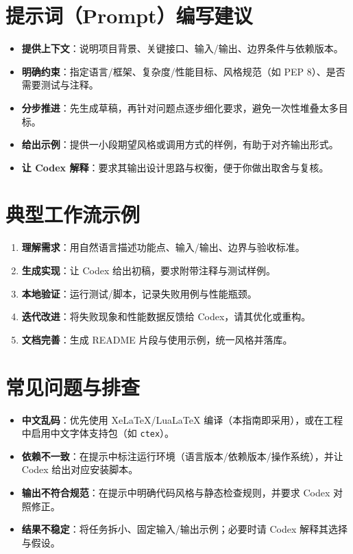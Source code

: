 \documentclass[UTF8,zihao=-4]{ctexart}
\begin{document}
\section{提示词（Prompt）编写建议}
\begin{itemize}
  \item \textbf{提供上下文}：说明项目背景、关键接口、输入/输出、边界条件与依赖版本。
  \item \textbf{明确约束}：指定语言/框架、复杂度/性能目标、风格规范（如 PEP 8）、是否需要测试与注释。
  \item \textbf{分步推进}：先生成草稿，再针对问题点逐步细化要求，避免一次性堆叠太多目标。
  \item \textbf{给出示例}：提供一小段期望风格或调用方式的样例，有助于对齐输出形式。
  \item \textbf{让 Codex 解释}：要求其输出设计思路与权衡，便于你做出取舍与复核。
\end{itemize}

\section{典型工作流示例}
\begin{enumerate}
  \item \textbf{理解需求}：用自然语言描述功能点、输入/输出、边界与验收标准。
  \item \textbf{生成实现}：让 Codex 给出初稿，要求附带注释与测试样例。
  \item \textbf{本地验证}：运行测试/脚本，记录失败用例与性能瓶颈。
  \item \textbf{迭代改进}：将失败现象和性能数据反馈给 Codex，请其优化或重构。
  \item \textbf{文档完善}：生成 README 片段与使用示例，统一风格并落库。
\end{enumerate}

\section{常见问题与排查}
\begin{itemize}
  \item \textbf{中文乱码}：优先使用 XeLaTeX/LuaLaTeX 编译（本指南即采用），或在工程中启用中文字体支持包（如 \texttt{ctex}）。
  \item \textbf{依赖不一致}：在提示中标注运行环境（语言版本/依赖版本/操作系统），并让 Codex 给出对应安装脚本。
  \item \textbf{输出不符合规范}：在提示中明确代码风格与静态检查规则，并要求 Codex 对照修正。
  \item \textbf{结果不稳定}：将任务拆小、固定输入/输出示例；必要时请 Codex 解释其选择与假设。
\end{itemize}
\end{document}
